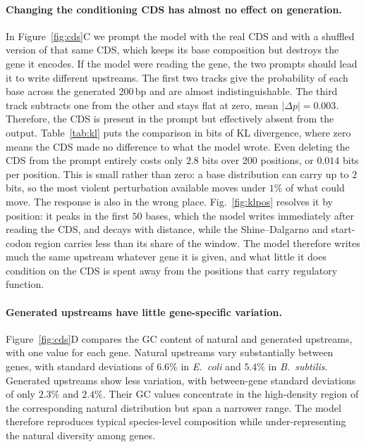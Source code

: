 \documentclass{article}
\newcommand{\rev}[1]{\begingroup\color{red}#1\endgroup}
\begin{document}
\paragraph{Changing the conditioning CDS has almost no effect on generation.}
In Figure~\ref{fig:cds}C we prompt the model with the real CDS and with a
shuffled version of that same CDS, which keeps its base composition but destroys
the gene it encodes. If the model were reading the gene, the two prompts should
lead it to write different upstreams. The first two tracks give the probability of
each base across the generated 200\,bp and are almost indistinguishable. The
third track subtracts one from the other and stays flat at zero, mean
$|\Delta p|=0.003$. Therefore, the CDS is present in the prompt but effectively absent
from the output. Table~\ref{tab:kl} puts the comparison in bits of
KL divergence, where zero means the CDS made no difference to what the model wrote.
Even deleting the CDS from the prompt entirely costs only $2.8$ bits over 200
positions, or $0.014$ bits per position. \rev{This is small rather than zero: a base
distribution can carry up to $2$ bits, so the most violent perturbation available
moves under $1\%$ of what could move. The response is also in the wrong place.
Fig.~\ref{fig:klpos} resolves it by position: it peaks in the first $50$ bases,
which the model writes immediately after reading the CDS, and decays with
distance, while the Shine--Dalgarno and start-codon region carries less than its
share of the window. The model therefore writes much the same upstream whatever
gene it is given, and what little it does condition on the CDS is spent away from
the positions that carry regulatory function.}

\paragraph{Generated upstreams have little gene-specific variation.}
Figure~\ref{fig:cds}D compares the GC content of natural and generated upstreams,
with one value for each gene. Natural upstreams vary substantially between
genes, with standard deviations of $6.6\%$ in \emph{E.~coli} and $5.4\%$ in
\emph{B.~subtilis}. Generated upstreams show less variation, with between-gene standard
deviations of only $2.3\%$ and $2.4\%$. Their GC values concentrate in the
high-density region of the corresponding natural distribution but span a
narrower range. The model therefore reproduces typical species-level composition
while under-representing the natural diversity among genes.
\end{document}
